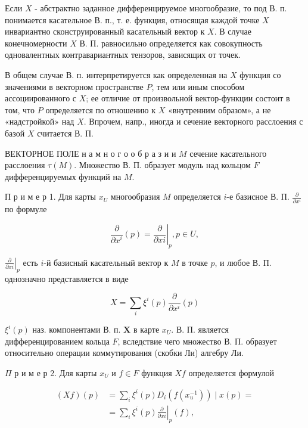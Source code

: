 \documentclass[10pt]{article}
\begin{document}
Если $X$ - абстрактно заданное дифференцируемое многообразие, то под В. п. понимается касательное В. п., т. е. функция, относящая каждой точке $X$ инвариантно сконструированный касательный вектор к $X$. В случае конечномерности $X$ В. П. равносильно определяется как совокупность одновалентных контравариантных тензоров, зависящих от точек.



В общем случае В. п. интерпретируется как определенная на $X$ функция со значениями в векторном пространстве $P$, тем или иным способом ассоциированного с $X$; ее отличие от произвольной вектор-функции состоит в том, что $P$ определяется по отношению к $X$ «внутренним образом», а не «надстройкой» над $X$. Впрочем, напр., иногда и сечение векторного расслоения с базой $X$ считается В. П.



ВЕКТОРНОЕ ПОЛЕ н а м н о г о о б р а з и и $M$ сечение касательного расслоения $\tau(M)$. Множество В. П. образует модуль над кольцом $F$ дифференцируемых функций на $M$.



П р и м е р 1. Для карты $x_{U}$ многообразия $M$ определяется $i$-е базисное В. П. $\frac{\partial}{\partial x^{i}}$ по формуле



\[

\frac{\partial}{\partial x^{i}}(p)=\left.\frac{\partial}{\partial x i}\right|_{p}, p \in U,

\]



$\left.\frac{\partial}{\partial x i}\right|_{p}$ есть $i$-й базисный касательный вектор к $M$ в точке $p$, и любое В. П. однозначно представляется в виде



\[

X=\sum_{i} \xi^{i}(p) \frac{\partial}{\partial x^{i}}(p)

\]



$\xi^{i}(p)$ наз. компонентами В. п. $\boldsymbol{X}$ в карте $x_{U}$. В. П. является дифференцированием кольца $F$, вследствие чего множество В. П. образует относительно операции коммутирования (скобки Ли) алгебру Ли.



$\Pi$ р и м е р 2. Для карты $x_{U}$ и $f \in F$ функция $X f$ определяется формулой



\[

\begin{aligned}

(X f)(p) & =\sum_{i} \xi^{i}(p) D_{i}\left(f\left(x_{u}^{-1}\right)\right) \mid x(p)= \\

& =\left.\sum_{i} \xi^{i}(p) \frac{\partial}{\partial x i}\right|_{p}(f),

\end{aligned}

\]
\end{document}

